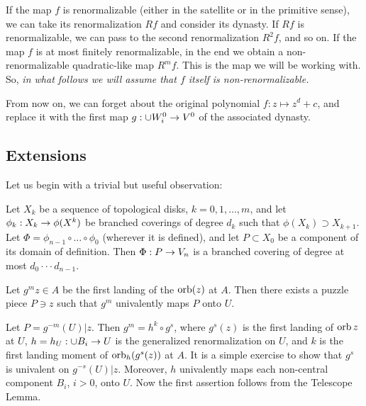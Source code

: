 If the map $f$ is renormalizable (either in the satellite or in the  primitive sense), 
we can take its renormalization $Rf$
and consider its dynasty. If $Rf$ is renormalizable, 
we can pass to the second renormalization $R^2 f$,   and so on. 
If the map $f$ is at most finitely renormalizable, 
in the end we obtain a non-renormalizable quadratic-like map $R^m f$.
This is the map we will be working with. 
So, {\it in what follows we will assume that $f$ itself is non-renormalizable.}

From now on, we can forget about the original polynomial $f: z\mapsto z^d +c $,
and  replace it with the first map $g: \cup W_i^0\rightarrow V^0$ of the associated dynasty.


\subsection{Extensions}

Let us begin with a trivial but  useful observation:

\begin{lem}[Telescope]\label{telescope}
  Let $X_k$ be a sequence of topological disks, $k=0,1,\dots, m$,
and let $\phi_k : X_k \rightarrow \phi(X^k)$  be  branched coverings of degree $d_k$ such that
$\phi(X_k)\supset X_{k+1}$. Let $\Phi= \phi_{n-1}\circ\dots\circ \phi_0$ (wherever it is defined),
and let $P\subset X_0$ be a component of its domain of definition.
Then $\Phi: P \rightarrow V_n$ is a branched covering of degree at most $d_0\cdot\cdot\cdot d_{n-1}$.
\end{lem}


\begin{lem}\label{landing extension}
  Let $g^m z\in A $ be the first landing  of the $\operatorname{orb}(z)$ at $A$.
Then there exists a puzzle piece $P\ni z$ such that $g^m$ univalently maps $P$ onto $U $. 
\end{lem}  

\begin{pf}
  Let $P= g^{-m} (U) |z$. Then $g^m = h^k \circ g^s$, where $g^s(z)$ is the first landing of $\operatorname{orb} z$
at $U$, $h=h_U: \cup B_i\rightarrow U$ is the generalized renormalization on $U$, and $k$ is the first landing moment
of $\operatorname{orb}_h(g^s(z))$ at $A$. It is a simple exercise to show that $g^s$ is univalent
on $g^{-s}(U)|z$. Moreover,  $h$  univalently maps each non-central component $B_i$, $i>0$, onto $U$.
Now the first assertion follows from the Telescope Lemma.


\end{pf}  


